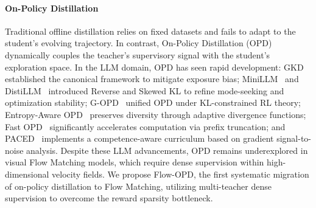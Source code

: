 \paragraph{On-Policy Distillation}
Traditional offline distillation relies on fixed datasets and fails to adapt to the student's evolving trajectory. In contrast, On-Policy Distillation (OPD) dynamically couples the teacher's supervisory signal with the student’s exploration space. In the LLM domain, OPD has seen rapid development: GKD~\cite{agarwal2024policy} established the canonical framework to mitigate exposure bias; MiniLLM~\cite{gu2024minillm} and DistiLLM~\cite{ko2025distillm} introduced Reverse and Skewed KL to refine mode-seeking and optimization stability; G-OPD~\cite{yang2026learning} unified OPD under KL-constrained RL theory; Entropy-Aware OPD~\cite{jin2026entropy} preserves diversity through adaptive divergence functions; Fast OPD~\cite{zhang2026fast} significantly accelerates computation via prefix truncation; and PACED~\cite{xu2026paced} implements a competence-aware curriculum based on gradient signal-to-noise analysis. Despite these LLM advancements, OPD remains underexplored in visual Flow Matching models, which require dense supervision within high-dimensional velocity fields. We propose Flow-OPD, the first systematic migration of on-policy distillation to Flow Matching, utilizing multi-teacher dense supervision to overcome the reward sparsity bottleneck.